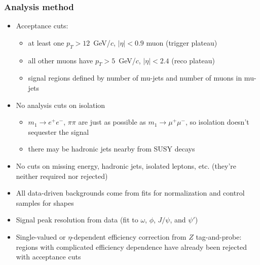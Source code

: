\documentclass[compress]{beamer}
\begin{document}
\begin{frame}
\frametitle{Analysis method}
\begin{itemize}
\item Acceptance cuts:
\begin{itemize}
\item at least one $p_T > 12$~GeV/$c$, $|\eta| < 0.9$ muon (trigger plateau)
\item all other muons have $p_T > 5$~GeV/$c$, $|\eta| < 2.4$ (reco plateau)
\item signal regions defined by number of mu-jets and number of muons in mu-jets
\end{itemize}

\item No analysis cuts on isolation
\begin{itemize}
\item $m_1 \to e^+e^-$, $\pi\pi$ are just as possible as $m_1 \to \mu^+\mu^-$, so isolation doesn't sequester the signal
\item there may be hadronic jets nearby from SUSY decays
\end{itemize}

\item No cuts on missing energy, hadronic jets, isolated leptons,
  etc. (they're neither required nor rejected)

\item All data-driven backgrounds come from fits for normalization and control samples for shapes

\item Signal peak resolution from data (fit to $\omega$, $\phi$, $J/\psi$, and $\psi'$)

\item Single-valued or $\eta$-dependent efficiency correction from $Z$
  tag-and-probe: regions with complicated efficiency dependence have
  already been rejected with acceptance cuts
\end{itemize}
\end{frame}
\end{document}
